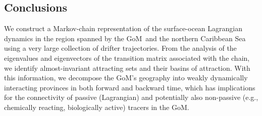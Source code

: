 \documentclass[final]{beamer}
\newcommand{\gom}{GoM}
\begin{document}
\begin{frame}[t]
\begin{multicols}{3}
\section{Conclusions}
We construct a Markov-chain representation of the surface-ocean Lagrangian dynamics in the region spanned by the \gom\ and the northern Caribbean Sea using a very large collection of drifter trajectories. From the analysis of the eigenvalues and eigenvectors of the transition matrix associated with the chain, we identify almost-invariant attracting sets and their basins of attraction. With this information, we decompose the GoM's geography into weakly dynamically interacting provinces in both forward and backward time, which has implications for the connectivity of passive (Lagrangian) and potentially also non-passive (e.g., chemically reacting, biologically active) tracers in the \gom. 

\vspace{0.5cm}

\begingroup
\renewcommand{\section}[2]{}%
\small{}
\endgroup

\end{multicols}
\end{frame}
\end{document}
